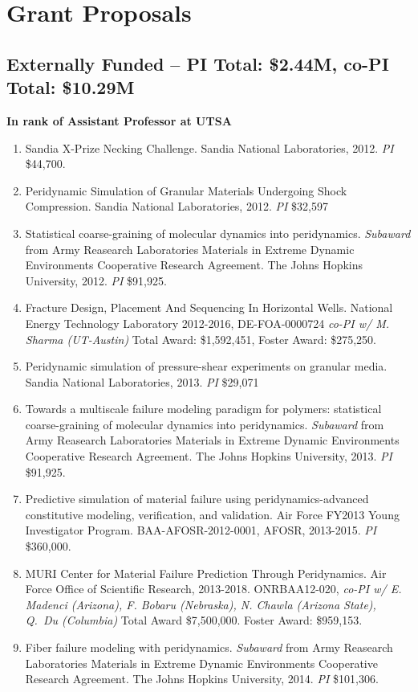 \section*{Grant Proposals}

\subsection*{Externally Funded -- \textbf{PI Total: \$2.44M,  co-PI Total: \$10.29M}} 

\ifdefined\iscockrell
    \pagebreak[2]
    \textbf{In rank of Assistant Professor at UTSA}
\begin{enumerate}
  \item Sandia X-Prize Necking Challenge.  Sandia National Laboratories, 2012. \textit{PI} \$44,700.
  \item Peridynamic Simulation of Granular Materials Undergoing Shock Compression.  Sandia National Laboratories, 2012. \textit{PI} \$32,597
  \item Statistical coarse-graining of molecular dynamics into peridynamics. \textit{Subaward} from Army Reasearch Laboratories Materials in Extreme Dynamic Environments Cooperative Research Agreement.  The Johns Hopkins University, 2012. \textit{PI} \$91,925.
  \item Fracture Design, Placement And Sequencing In Horizontal Wells. National Energy Technology Laboratory 2012-2016, DE-FOA-0000724 \textit{co-PI w/ M. Sharma (UT-Austin)} Total Award: {\$1,592,451}, Foster Award: \$275,250.
  \item Peridynamic simulation of pressure-shear experiments on granular media.  Sandia National Laboratories, 2013. \textit{PI} \$29,071
  \item Towards a multiscale failure modeling paradigm for polymers: statistical coarse-graining of molecular dynamics into peridynamics. \textit{Subaward} from Army Reasearch Laboratories Materials in Extreme Dynamic Environments Cooperative Research Agreement.  The Johns Hopkins University, 2013. \textit{PI} \$91,925.
  \item Predictive simulation of material failure using peridynamics-advanced constitutive modeling, verification, and validation. Air Force FY2013 Young Investigator Program. BAA-AFOSR-2012-0001, AFOSR, 2013-2015. \textit{PI} \$360,000.
  \item MURI Center for Material Failure Prediction Through Peridynamics. Air Force Office of Scientific Research, 2013-2018. ONRBAA12-020, \textit{co-PI w/ E. Madenci (Arizona), F. Bobaru (Nebraska), N. Chawla (Arizona State), Q.\ Du (Columbia)} Total Award {\$}7,500,000.  Foster Award: \$959,153.
  \item Fiber failure modeling with peridynamics. \textit{Subaward} from Army Reasearch Laboratories Materials in Extreme Dynamic Environments Cooperative Research Agreement.  The Johns Hopkins University, 2014. \textit{PI} \$101,306.
\end{enumerate}
